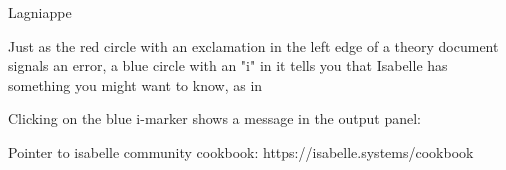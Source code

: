 Lagniappe

Just as the red circle with an exclamation in the left edge of a theory document signals an error, a blue circle with an "i" in it tells you that Isabelle has something you might want to know, as in 

Clicking on the blue i-marker shows a message in the output panel:

 

Pointer to isabelle community cookbook: https://isabelle.systems/cookbook
